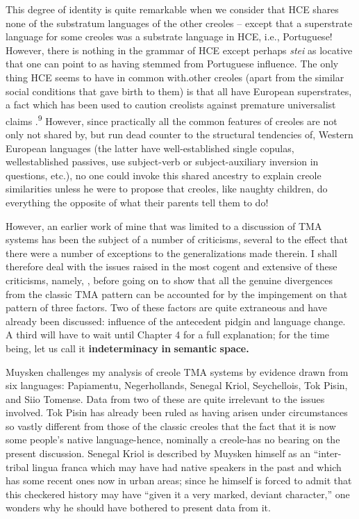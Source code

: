 This degree of identity is quite remarkable when we consider
that HCE shares none of the substratum languages of the other creoles --
except that a superstrate language for some creoles was a substrate language in HCE, i.e., Portuguese! However, there is nothing in the grammar of HCE except perhaps \textit{stei }as locative that one can point to as having stemmed from Portuguese influence. The only thing HCE seems to have in common with.other creoles (apart from the simi\-lar social conditions that gave birth to them) is that all have European superstrates, a fact which has been used to caution creolists against premature universalist claims \citep{Reinecke1977}.\textsuperscript{9} However, since practi\-cally all the common features of creoles are not only not shared by, but run dead counter to the structural tendencies of, Western Euro\-pean languages (the latter have well-established single copulas, well\-established passives, use subject-verb or subject-auxiliary inversion in questions, etc.), no one could invoke this shared ancestry to explain creole similarities unless he were to propose that creoles, like naughty children, do everything the opposite of what their parents tell them to do!

However, an earlier work of mine \citep{Bickerton1974} that was limited to a discussion of TMA systems has been the subject of a number of criticisms, several to the effect that there were a number of exceptions to the generalizations made therein. I shall therefore deal with the issues raised in the most cogent and extensive of these criti\-cisms, namely, \citet{Muysken1981a}, before going on to show that all the genuine divergences from the classic TMA pattern can be accounted for by the impingement on that pattern of three factors. Two of these factors are quite extraneous and have already been discussed: influence of the antecedent pidgin and language change. A third will have to wait until Chapter 4 for a full explanation; for the time being, let us call it \textbf{{\textquotedbl}indeterminacy} \textbf{in} \textbf{semantic} \textbf{space.{\textquotedbl}}

Muysken challenges my analysis of creole TMA systems by evidence drawn from six languages: Papiamentu, Negerhollands, Senegal Kriol, Seychellois, Tok Pisin, and Siio Tomense. Data from two of these are quite irrelevant to the issues involved. Tok Pisin has already been ruled as having arisen under circumstances so vastly different from those of the classic creoles that the fact that it is now some people's
native language-hence, nominally a creole-has no bearing on the present discussion. Senegal Kriol is described by Muysken himself as an ``inter-tribal lingua franca which may have had native speakers in the past and which has some recent ones now in urban areas{\textquotedbl}; since he himself is forced to admit that this checkered history may have ``given it a very marked, deviant character,'' one wonders why he should have bothered to present data from it.

